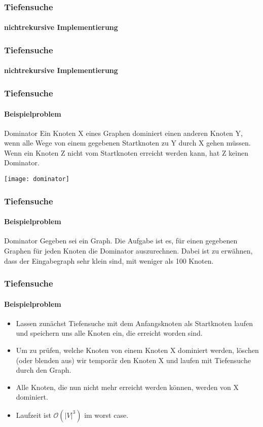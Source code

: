 \begin{frame}
	\frametitle{Tiefensuche}
	\framesubtitle{nichtrekursive Implementierung}
	
\end{frame}

\begin{frame}
	\frametitle{Tiefensuche}
	\framesubtitle{nichtrekursive Implementierung}
	
\end{frame}

\begin{frame}
	\frametitle{Tiefensuche}
	\framesubtitle{Beispielproblem}
	\begin{KITinfoblock}{Dominator}
		Ein Knoten X eines Graphen dominiert einen anderen Knoten Y, wenn alle Wege von einem gegebenen Startknoten zu Y durch X gehen müssen. Wenn ein Knoten Z nicht vom Startknoten erreicht werden kann, hat Z keinen Dominator.
	\end{KITinfoblock}
	\begin{center}
			\texttt{[image: dominator]}
	\end{center}
\end{frame}

\begin{frame}
	\frametitle{Tiefensuche}
	\framesubtitle{Beispielproblem}
		\begin{KITexampleblock}{Dominator}
			Gegeben sei ein Graph. Die Aufgabe ist es, für einen gegebenen Graphen für jeden Knoten die Dominator auszurechnen. Dabei ist zu erwähnen, dass der Eingabegraph sehr klein sind, mit weniger als 100 Knoten.
		\end{KITexampleblock}
\end{frame}

\begin{frame}
	\frametitle{Tiefensuche}
	\framesubtitle{Beispielproblem}
		\begin{itemize}
			\item Lassen zunächst Tiefensuche mit dem Anfangsknoten als Startknoten laufen und speichern uns alle Knoten ein, die erreicht worden sind.
			\pause
			\bigskip
			\item Um zu prüfen, welche Knoten von einem Knoten X dominiert werden, löschen (oder blenden aus) wir temporär den Knoten X und laufen mit Tiefensuche durch den Graph.
						\pause
						\bigskip
			\item Alle Knoten, die nun nicht mehr erreicht werden können, werden von X dominiert.
						\pause
						\bigskip
			\item Laufzeit ist $\mathcal{O}(|V|^3)$ im worst case.
		\end{itemize}
\end{frame}
